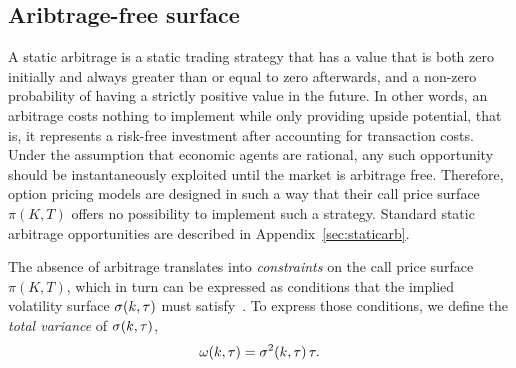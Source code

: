 
\subsection{Aribtrage-free surface} \label{sec:ao}

A static arbitrage is a static trading strategy that has
a value that is both zero initially and always greater than or equal to zero afterwards,
and a non-zero probability of having a strictly positive value in the future.
In other words, an arbitrage costs nothing to implement while only providing upside potential, that is,
it represents a risk-free investment after accounting for transaction costs.
Under the assumption that economic agents are rational, any such opportunity should be instantaneously exploited until the market is arbitrage free.
Therefore, option pricing models are designed in such a way that their call price surface $\pi(K,T)$ offers no possibility to implement such a strategy.
Standard static arbitrage opportunities are described in Appendix~\ref{sec:staticarb}.

The absence of arbitrage translates into \emph{constraints} on the call price surface $\pi(K,T)$, 
which in turn can be expressed as conditions that the implied volatility surface $\sigma(k,\tau)$ must satisfy~\cite{roper2010arbitrage,gatheral2014arbitrage}.
To express those conditions, we define the \emph{total variance} of $\sigma(k,\tau)$,
\begin{equation} \label{eq:siv_def}
  \omega(k,\tau)= \sigma^2(k,\tau) \, \tau.
\end{equation}

